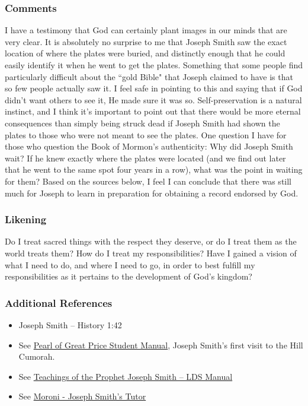 \documentclass[12pt]{report}
\begin{document}
\subsubsection{Comments\label{js:comments9}}
I have a testimony that God can certainly plant images in our minds that are very clear.  It is absolutely no surprise to me that Joseph Smith saw the exact location of where the plates were buried, and distinctly enough that he could easily identify it when he went to get the plates.  Something that some people find particularly difficult about the ``gold Bible" that Joseph claimed to have is that so few people actually saw it.  I feel safe in pointing to this and saying that if God didn't want others to see it, He made sure it was so.  Self-preservation is a natural instinct, and I think it's important to point out that there would be more eternal consequences than simply being struck dead if Joseph Smith had shown the plates to those who were not meant to see the plates.  One question I have for those who question the Book of Mormon's authenticity: Why did Joseph Smith wait?  If he knew exactly where the plates were located (and we find out later that he went to the same spot four years in a row), what was the point in waiting for them?  Based on the sources below, I feel I can conclude that there was still much for Joseph to learn in preparation for obtaining a record endorsed by God.  

\subsubsection{Likening\label{js:likening9}}
Do I treat sacred things with the respect they deserve, or do I treat them as the world treats them?  How do I treat my responsibilities?  Have I gained a vision of what I need to do, and where I need to go, in order to best fulfill my responsibilities as it pertains to the development of God's kingdom?

\subsubsection{Additional References\label{js:references9}}
\begin{itemize}
\item Joseph Smith -- History 1:42
\item See \href{https://www.lds.org/manual/the-pearl-of-great-price-student-manual/joseph-smith-history?lang=eng}{Pearl of Great Price Student Manual}, Joseph Smith's first visit to the Hill Cumorah.
\item See \href{https://www.lds.org/manual/teachings-joseph-smith/chapter-4?lang=eng}{Teachings of the Prophet Joseph Smith -- LDS Manual}
\item See \href{https://www.lds.org/ensign/1992/01/moroni-joseph-smiths-tutor?lang=eng}{Moroni - Joseph Smith's Tutor}
\end{itemize}
\end{document}

